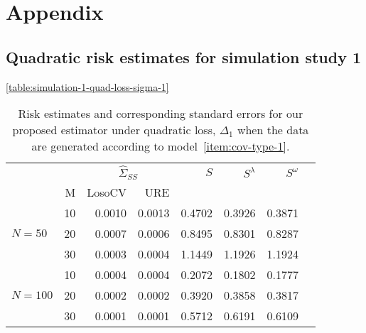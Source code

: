 \documentclass[12pt]{article}
\theoremstyle{definition}
\begin{document}
\section{Appendix}

\subsection{Quadratic risk estimates for simulation study 1}
\begin{table}[H]\ref{table:simulation-1-quad-loss-sigma-1}
\caption{Risk estimates and corresponding standard errors for our proposed estimator under quadratic loss, $\Delta_1$ when the data are generated according to model~\ref{item:cov-type-1}.} 
\centering
\begin{tabular}{l|r|rrrrrr}
&  & \multicolumn{2}{c}{$\hat{\Sigma}_{SS}$} & $S$ & $S^\lambda$ & $S^\omega$ \\ 
&M & \mbox{LosoCV} & \mbox{URE} &  \\ 
\hline
		&    10 & 0.0010 & 0.0013 & 0.4702  & 0.3926 & 0.3871 \\ 
$N = 50$  &    20 & 0.0007 &  0.0006	& 0.8495 & 0.8301 & 0.8287 \\ 
  		&    30 & 0.0003 &  0.0004	& 1.1449 & 1.1926 & 1.1924  \\ \hdashline
		 &    10 & 0.0004 &  0.0004	& 0.2072 &  0.1802 & 0.1777\\ 
$N = 100$ &    20 & 0.0002 & 0.0002	& 0.3920  & 0.3858 & 0.3817 \\ 
   &    30 & 0.0001 & 0.0001 &0.5712 & 0.6191 & 0.6109 \\ 
\end{tabular}
\end{table}

\end{document}
